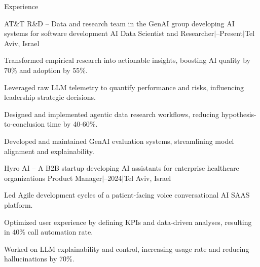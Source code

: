 \documentclass{resume} %
\begin{document}
\begin{rSection}{Experience}

\begin{rSubsection}
	{AT\&T R\&D -- {\small Data and research team in the GenAI group developing AI systems for software development}}
	{}
	{AI Data Scientist and Researcher\quad$\vert$--Present\quad$\vert$\quad Tel Aviv, Israel}
	{}
	
	\setlength{\itemindent}{.5cm}
	
	\item Transformed empirical research into actionable insights, boosting AI quality by 70\% and adoption by 55\%.
		
	\item Leveraged raw LLM telemetry to quantify performance and risks, influencing leadership strategic decisions.
	
	\item Designed and implemented agentic data research workflows, reducing hypothesis-to-conclusion time by 40-60\%.
	
	\item Developed and maintained GenAI evaluation systems, streamlining model alignment and explainability.

\end{rSubsection}

\begin{rSubsection}
	{Hyro AI -- {\small A B2B startup developing AI assistants for enterprise healthcare organizations}}
	{}
	{Product Manager\quad$\vert$--2024\quad$\vert$\quad Tel Aviv, Israel}
	{}

	\setlength{\itemindent}{.5cm}
		
	\item Led Agile development cycles of a patient-facing voice conversational AI SAAS platform.
	\item Optimized user experience by defining KPIs and data-driven analyses, resulting in 40\% call automation rate.
	\item Worked on LLM explainability and control, increasing usage rate and reducing hallucinations by 70\%.


\end{rSubsection}
\end{rSection}
\end{document}
